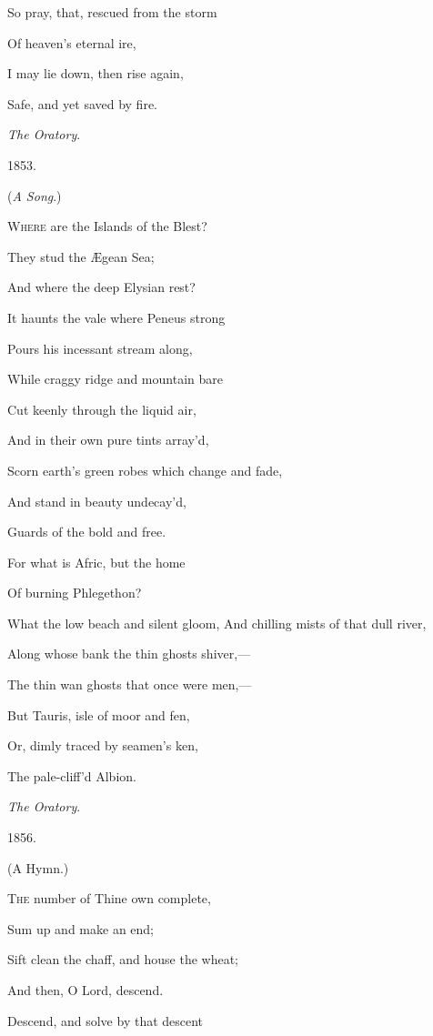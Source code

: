 So pray, that, rescued from the storm

Of heaven's eternal ire,

I may lie down, then rise again,

Safe, and yet saved by fire.

\emph{The Oratory}.

1853.


(\emph{A Song}.)

W\textsc{here} are the Islands of the Blest?

They stud the Ægean
Sea;

And where the deep Elysian rest?

It haunts the vale where Peneus strong

Pours his incessant stream along,

While craggy ridge and mountain bare

Cut keenly through the liquid air,

And in their own pure tints array'd,

Scorn earth's green robes which change and
fade,

And stand in beauty undecay'd,

Guards of the bold
and free.

For what is Afric, but the home

Of burning
Phlegethon?

What the low beach and silent gloom, And chilling mists of that dull river,

Along whose bank the thin ghosts shiver,—

The thin wan ghosts that once were men,—

But Tauris, isle of moor and fen,

Or, dimly traced by seamen's ken,

The pale-cliff'd
Albion.

\emph{The Oratory}.

1856.


(A Hymn.)

T\textsc{he} number of Thine own complete,

Sum up and make an end;

Sift clean the chaff, and house the wheat;

And then, O Lord, descend.

Descend, and solve by that descent

